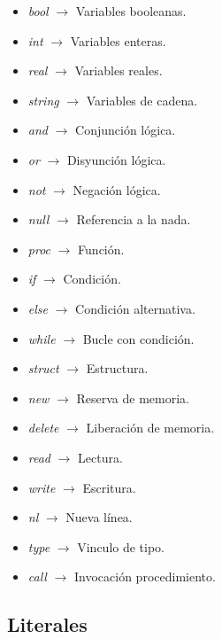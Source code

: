 \begin{itemize}
    \item \textit{bool} $\rightarrow$ Variables booleanas.
    \item \textit{int} $\rightarrow$ Variables enteras.
    \item \textit{real} $\rightarrow$ Variables reales.
    \item \textit{string} $\rightarrow$ Variables de cadena.
    \item \textit{and} $\rightarrow$ Conjunción lógica.
    \item \textit{or} $\rightarrow$ Disyunción lógica.
    \item \textit{not} $\rightarrow$ Negación lógica.
    \item \textit{null} $\rightarrow$ Referencia a la nada.
    \item \textit{proc} $\rightarrow$ Función.
    \item \textit{if} $\rightarrow$ Condición.
    \item \textit{else} $\rightarrow$ Condición alternativa.
    \item \textit{while} $\rightarrow$ Bucle con condición.
    \item \textit{struct} $\rightarrow$ Estructura.
    \item \textit{new} $\rightarrow$ Reserva de memoria.
    \item \textit{delete} $\rightarrow$ Liberación de memoria.
    \item \textit{read} $\rightarrow$ Lectura.
    \item \textit{write} $\rightarrow$ Escritura.
    \item \textit{nl} $\rightarrow$ Nueva línea.
    \item \textit{type} $\rightarrow$ Vinculo de tipo.
    \item \textit{call} $\rightarrow$ Invocación procedimiento.
\end{itemize}

\subsection{Literales}

